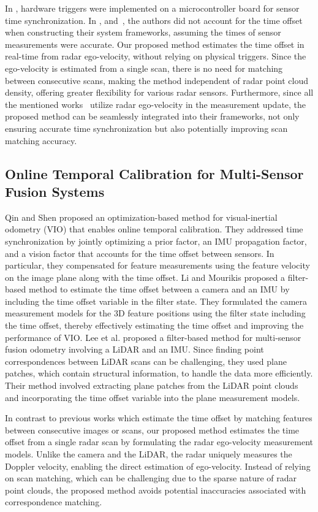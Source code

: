 In \cite{9235254, 9317343, 9470842}, hardware triggers were implemented on a microcontroller board for sensor time synchronization. In \cite{10610666}, and~\cite{9981396, 10160482, 10100861}, the authors did not account for the time offset when constructing their system frameworks, assuming the times of sensor measurements were accurate. Our proposed method estimates the time offset in real-time from radar ego-velocity, without relying on physical triggers. Since the ego-velocity is estimated from a single scan, there is no need for matching between consecutive scans, making the method independent of radar point cloud density, offering greater flexibility for various radar sensors. Furthermore, since all the mentioned works~\cite{10610666, 9317343, 9235254, 9470842, 9981396, 10160482, 10100861} utilize radar ego-velocity in the measurement update, the proposed method can be seamlessly integrated into their frameworks, not only ensuring accurate time synchronization but also potentially improving scan matching accuracy.

\subsection{Online Temporal Calibration for Multi-Sensor Fusion Systems}
Qin and Shen \cite{8593603} proposed an optimization-based method for visual-inertial odometry (VIO) that enables online temporal calibration. They addressed time synchronization by jointly optimizing a prior factor, an IMU propagation factor, and a vision factor that accounts for the time offset between sensors. In particular, they compensated for feature measurements using the feature velocity on the image plane along with the time offset. Li and Mourikis \cite{li2014online} proposed a filter-based method to estimate the time offset between a camera and an IMU by including the time offset variable in the filter state. They formulated the camera measurement models for the 3D feature positions using the filter state including the time offset, thereby effectively estimating the time offset and improving the performance of VIO. Lee et al. \cite{9561254} proposed a filter-based method for multi-sensor fusion odometry involving a LiDAR and an IMU. Since finding point correspondences between LiDAR scans can be challenging, they used plane patches, which contain structural information, to handle the data more efficiently. Their method involved extracting plane patches from the LiDAR point clouds and incorporating the time offset variable into the plane measurement models.

In contrast to previous works \cite{8593603, li2014online, 9561254} which estimate the time offset by matching features between consecutive images or scans, our proposed method estimates the time offset from a single radar scan by formulating the radar ego-velocity measurement models. Unlike the camera and the LiDAR, the radar uniquely measures the Doppler velocity, enabling the direct estimation of ego-velocity. Instead of relying on scan matching, which can be challenging due to the sparse nature of radar point clouds, the proposed method avoids potential inaccuracies associated with correspondence matching.